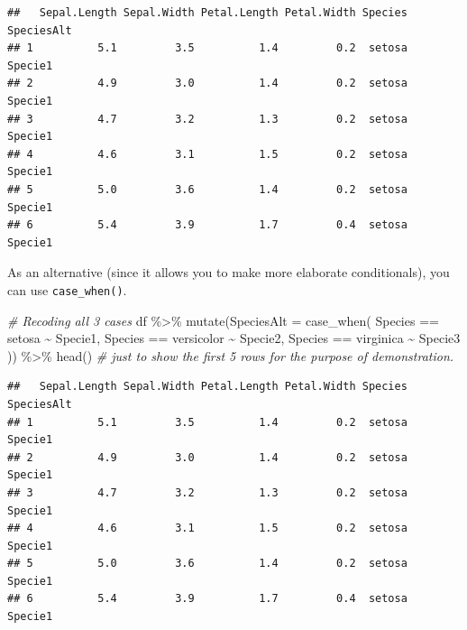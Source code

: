 \documentclass[
]{book}
\newenvironment{Shaded}{\begin{snugshade}}{\end{snugshade}}
\newcommand{\AttributeTok}[1]{\textcolor[rgb]{0.77,0.63,0.00}{#1}}
\newcommand{\CommentTok}[1]{\textcolor[rgb]{0.56,0.35,0.01}{\textit{#1}}}
\newcommand{\FunctionTok}[1]{\textcolor[rgb]{0.00,0.00,0.00}{#1}}
\newcommand{\NormalTok}[1]{#1}
\newcommand{\SpecialCharTok}[1]{\textcolor[rgb]{0.00,0.00,0.00}{#1}}
\newcommand{\StringTok}[1]{\textcolor[rgb]{0.31,0.60,0.02}{#1}}
\begin{document}
\begin{verbatim}
##   Sepal.Length Sepal.Width Petal.Length Petal.Width Species SpeciesAlt
## 1          5.1         3.5          1.4         0.2  setosa    Specie1
## 2          4.9         3.0          1.4         0.2  setosa    Specie1
## 3          4.7         3.2          1.3         0.2  setosa    Specie1
## 4          4.6         3.1          1.5         0.2  setosa    Specie1
## 5          5.0         3.6          1.4         0.2  setosa    Specie1
## 6          5.4         3.9          1.7         0.4  setosa    Specie1
\end{verbatim}

As an alternative (since it allows you to make more elaborate conditionals), you can use \texttt{case\_when()}.

\begin{Shaded}
\begin{Highlighting}[]
\CommentTok{\# Recoding all 3 cases}
\NormalTok{df }\SpecialCharTok{\%\textgreater{}\%} 
  \FunctionTok{mutate}\NormalTok{(}\AttributeTok{SpeciesAlt =} \FunctionTok{case\_when}\NormalTok{(}
\NormalTok{    Species }\SpecialCharTok{==} \StringTok{\textquotesingle{}setosa\textquotesingle{}} \SpecialCharTok{\textasciitilde{}} \StringTok{\textquotesingle{}Specie1\textquotesingle{}}\NormalTok{,}
\NormalTok{    Species }\SpecialCharTok{==} \StringTok{\textquotesingle{}versicolor\textquotesingle{}} \SpecialCharTok{\textasciitilde{}} \StringTok{\textquotesingle{}Specie2\textquotesingle{}}\NormalTok{,}
\NormalTok{    Species }\SpecialCharTok{==} \StringTok{\textquotesingle{}virginica\textquotesingle{}} \SpecialCharTok{\textasciitilde{}} \StringTok{\textquotesingle{}Specie3\textquotesingle{}}
\NormalTok{  )) }\SpecialCharTok{\%\textgreater{}\%} 
  \FunctionTok{head}\NormalTok{()  }\CommentTok{\# just to show the first 5 rows for the purpose of demonstration.}
\end{Highlighting}
\end{Shaded}

\begin{verbatim}
##   Sepal.Length Sepal.Width Petal.Length Petal.Width Species SpeciesAlt
## 1          5.1         3.5          1.4         0.2  setosa    Specie1
## 2          4.9         3.0          1.4         0.2  setosa    Specie1
## 3          4.7         3.2          1.3         0.2  setosa    Specie1
## 4          4.6         3.1          1.5         0.2  setosa    Specie1
## 5          5.0         3.6          1.4         0.2  setosa    Specie1
## 6          5.4         3.9          1.7         0.4  setosa    Specie1
\end{verbatim}
\end{document}
